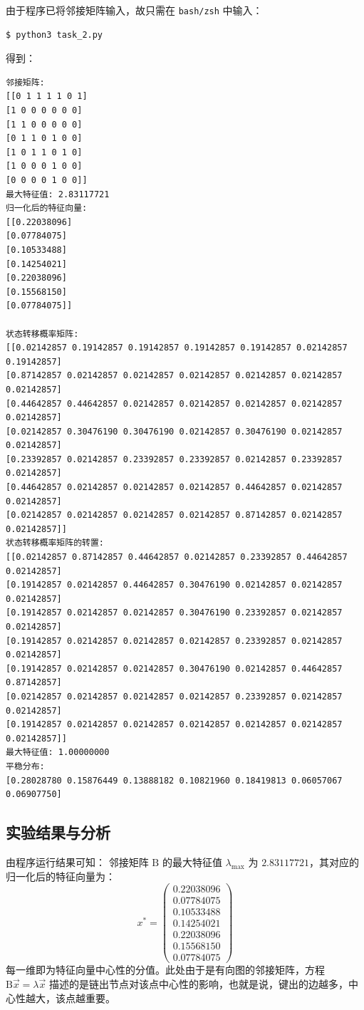 \documentclass{article}
\begin{document}
由于程序已将邻接矩阵输入，故只需在 \lstinline{bash/zsh} 中输入：
\begin{lstlisting}
$ python3 task_2.py
\end{lstlisting}
得到：
\begin{lstlisting}
邻接矩阵: 
[[0 1 1 1 1 0 1]
[1 0 0 0 0 0 0]
[1 1 0 0 0 0 0]
[0 1 1 0 1 0 0]
[1 0 1 1 0 1 0]
[1 0 0 0 1 0 0]
[0 0 0 0 1 0 0]]
最大特征值: 2.83117721
归一化后的特征向量: 
[[0.22038096]
[0.07784075]
[0.10533488]
[0.14254021]
[0.22038096]
[0.15568150]
[0.07784075]]

状态转移概率矩阵: 
[[0.02142857 0.19142857 0.19142857 0.19142857 0.19142857 0.02142857 0.19142857]
[0.87142857 0.02142857 0.02142857 0.02142857 0.02142857 0.02142857 0.02142857]
[0.44642857 0.44642857 0.02142857 0.02142857 0.02142857 0.02142857 0.02142857]
[0.02142857 0.30476190 0.30476190 0.02142857 0.30476190 0.02142857 0.02142857]
[0.23392857 0.02142857 0.23392857 0.23392857 0.02142857 0.23392857 0.02142857]
[0.44642857 0.02142857 0.02142857 0.02142857 0.44642857 0.02142857 0.02142857]
[0.02142857 0.02142857 0.02142857 0.02142857 0.87142857 0.02142857 0.02142857]]
状态转移概率矩阵的转置: 
[[0.02142857 0.87142857 0.44642857 0.02142857 0.23392857 0.44642857 0.02142857]
[0.19142857 0.02142857 0.44642857 0.30476190 0.02142857 0.02142857 0.02142857]
[0.19142857 0.02142857 0.02142857 0.30476190 0.23392857 0.02142857 0.02142857]
[0.19142857 0.02142857 0.02142857 0.02142857 0.23392857 0.02142857 0.02142857]
[0.19142857 0.02142857 0.02142857 0.30476190 0.02142857 0.44642857 0.87142857]
[0.02142857 0.02142857 0.02142857 0.02142857 0.23392857 0.02142857 0.02142857]
[0.19142857 0.02142857 0.02142857 0.02142857 0.02142857 0.02142857 0.02142857]]
最大特征值: 1.00000000
平稳分布: 
[0.28028780 0.15876449 0.13888182 0.10821960 0.18419813 0.06057067 0.06907750]
\end{lstlisting}

\subsection{实验结果与分析}

由程序运行结果可知：
邻接矩阵 $\mathrm{B}$ 的最大特征值 $\lambda_{\mathrm{max}}$ 为 $2.83117721$，其对应的归一化后的特征向量为：
$$
x^{*}=
\begin{pmatrix}
    0.22038096\\
    0.07784075\\
    0.10533488\\
    0.14254021\\
    0.22038096\\
    0.15568150\\
    0.07784075
\end{pmatrix}
$$
每一维即为特征向量中心性的分值。此处由于是有向图的邻接矩阵，方程 ${\mathrm{B}}\vec{x}=\lambda \vec{x}$ 描述的是链出节点对该点中心性的影响，也就是说，键出的边越多，中心性越大，该点越重要。
\end{document}
